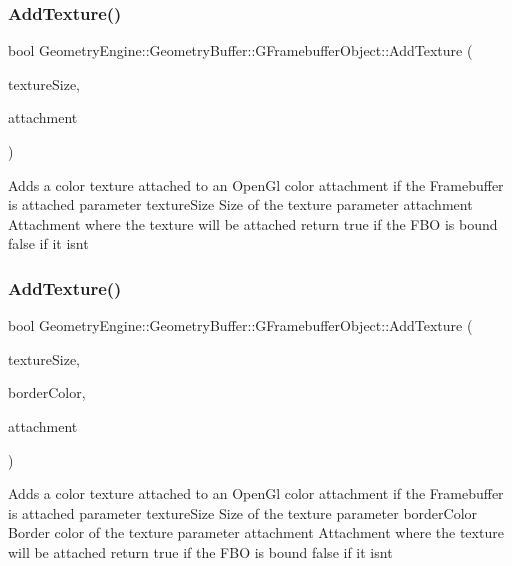 \subsubsection{\texorpdfstring{AddTexture()}{AddTexture()}\hspace{0.1cm}{\footnotesize\ttfamily [2/3]}}
{\footnotesize\ttfamily bool Geometry\+Engine\+::\+Geometry\+Buffer\+::\+G\+Framebuffer\+Object\+::\+Add\+Texture (\begin{DoxyParamCaption}\item[{const Q\+Vector2D \&}]{texture\+Size,  }\item[{G\+Framebuffer\+Commons\+::\+G\+\_\+\+C\+O\+L\+O\+R\+\_\+\+A\+T\+T\+A\+C\+H\+M\+E\+N\+TS}]{attachment }\end{DoxyParamCaption})}

Adds a color texture attached to an Open\+Gl color attachment if the Framebuffer is attached parameter texture\+Size Size of the texture parameter attachment Attachment where the texture will be attached return true if the F\+BO is bound false if it isn\textquotesingle{}t \mbox{\label{class_geometry_engine_1_1_geometry_buffer_1_1_g_framebuffer_object_abc4ab65f4ab2f63771d2dc1e36b4d45d}} 
\subsubsection{\texorpdfstring{AddTexture()}{AddTexture()}\hspace{0.1cm}{\footnotesize\ttfamily [3/3]}}
{\footnotesize\ttfamily bool Geometry\+Engine\+::\+Geometry\+Buffer\+::\+G\+Framebuffer\+Object\+::\+Add\+Texture (\begin{DoxyParamCaption}\item[{const Q\+Vector2D \&}]{texture\+Size,  }\item[{const Q\+Vector3D \&}]{border\+Color,  }\item[{G\+Framebuffer\+Commons\+::\+G\+\_\+\+C\+O\+L\+O\+R\+\_\+\+A\+T\+T\+A\+C\+H\+M\+E\+N\+TS}]{attachment }\end{DoxyParamCaption})}

Adds a color texture attached to an Open\+Gl color attachment if the Framebuffer is attached parameter texture\+Size Size of the texture parameter border\+Color Border color of the texture parameter attachment Attachment where the texture will be attached return true if the F\+BO is bound false if it isn\textquotesingle{}t \mbox{\label{class_geometry_engine_1_1_geometry_buffer_1_1_g_framebuffer_object_a0608caec59adf85a55effb74f0c9c8c9}} 

